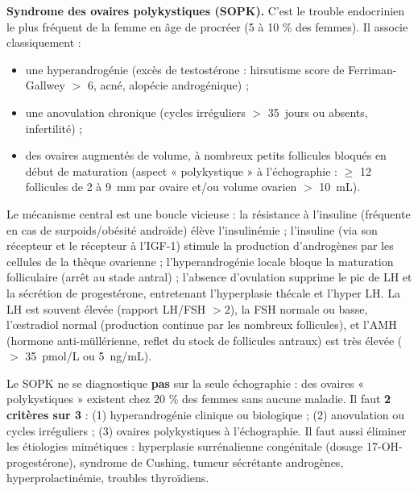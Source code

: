 \documentclass[11pt]{article}
\newcommand{\cle}[1]{{\popxbold\color{popdark}#1}}
\begin{document}
\textbf{Syndrome des ovaires polykystiques (SOPK).} C'est le trouble endocrinien le plus fréquent de la femme en âge de procréer (5 à 10 \% des femmes). Il associe classiquement :
\begin{itemize}
\item une \cle{hyperandrogénie} (excès de testostérone : hirsutisme score de Ferriman-Gallwey $>$ 6, acné, alopécie androgénique) ;
\item une \cle{anovulation} chronique (cycles irréguliers $>$ \SI{35}{jours} ou absents, infertilité) ;
\item des ovaires augmentés de volume, à nombreux petits follicules bloqués en début de maturation (aspect « polykystique » à l'échographie : $\ge$ 12 follicules de 2 à \SI{9}{mm} par ovaire et/ou volume ovarien $>$ \SI{10}{mL}).
\end{itemize}
Le mécanisme central est une boucle vicieuse : la \cle{résistance à l'insuline} (fréquente en cas de surpoids/obésité androïde) élève l'insulinémie ; l'insuline (via son récepteur et le récepteur à l'IGF-1) stimule la production d'androgènes par les \cle{cellules de la thèque} ovarienne ; l'hyperandrogénie locale bloque la maturation folliculaire (arrêt au stade antral) ; l'absence d'ovulation supprime le pic de LH et la sécrétion de progestérone, entretenant l'hyperplasie thécale et l'hyper LH. La LH est souvent élevée (rapport LH/FSH $> 2$), la FSH normale ou basse, l'œstradiol normal (production continue par les nombreux follicules), et l'\cle{AMH} (hormone anti-müllérienne, reflet du stock de follicules antraux) est très élevée ($>$ \SI{35}{pmol/L} ou \SI{5}{ng/mL}).

\begin{attention}
Le SOPK ne se diagnostique \textbf{pas} sur la seule échographie : des ovaires « polykystiques » existent chez 20 \% des femmes sans aucune maladie. Il faut \textbf{2 critères sur 3} : (1) hyperandrogénie clinique ou biologique ; (2) anovulation ou cycles irréguliers ; (3) ovaires polykystiques à l'échographie. Il faut aussi éliminer les étiologies mimétiques : hyperplasie surrénalienne congénitale (dosage 17-OH-progestérone), syndrome de Cushing, tumeur sécrétante androgènes, hyperprolactinémie, troubles thyroïdiens.
\end{attention}
\end{document}

